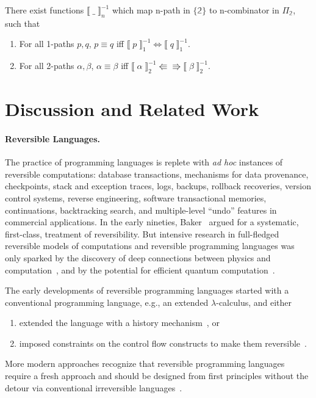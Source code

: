 \documentclass{entcs}
\newcommand{\isotwo}{\Leftrightarrow}
\newcommand{\isothree}{\Lleftarrow \! \! \! \! \Rrightarrow}
\newcommand{\bt}{\mathbb{2}}
\newcommand{\dbracket}[1]{\ensuremath{\llbracket \; #1 \; \rrbracket}}
\newcommand{\PiTwo}{\ensuremath{\Pi_{\mathbb{2}}}}
\begin{document}
\begin{theorem}[Soundness and completeness for $\{\bt\}$]
  There exist functions $\dbracket{ \_ }_n^{-1}$ which map n-path in $\{\bt\}$ to n-combinator in $\PiTwo$,
  such that
  \begin{enumerate}
  \item For all 1-paths $p, q$, $p \equiv q$ iff $\dbracket{ p }_1^{-1} \isotwo \dbracket{ q }_1^{-1}$.
  \item For all 2-paths $\alpha, \beta$, $\alpha \equiv \beta$ iff $\dbracket{ \alpha }_2^{-1} \isothree \dbracket{ \beta }_2^{-1}$.
  \end{enumerate}
\end{theorem}

\section{Discussion and Related Work}
\label{sec:discussion}

\paragraph*{Reversible Languages.}
\noindent The practice of programming languages is replete with \emph{ad hoc}
instances of reversible computations: database transactions, mechanisms for data
provenance, checkpoints, stack and exception traces, logs, backups, rollback
recoveries, version control systems, reverse engineering, software transactional
memories, continuations, backtracking search, and multiple-level ``undo''
features in commercial applications. In the early nineties,
Baker~\cite{Baker:1992:LLL,Baker:1992:NFT} argued for a systematic, first-class,
treatment of reversibility. But intensive research in full-fledged reversible
models of computations and reversible programming languages was only sparked by
the discovery of deep connections between physics and
computation~\cite{Landauer:1961,PhysRevA.32.3266,Toffoli:1980,bennett1985fundamental,Frank:1999:REC:930275},
and by the potential for efficient quantum
computation~\cite{springerlink:10.1007/BF02650179}.

The early developments of reversible programming languages started with a
conventional programming language, e.g., an extended $\lambda$-calculus, and either
\begin{enumerate}
\item extended the language with a history
mechanism~\cite{vanTonder:2004,Kluge:1999:SEMCD,lorenz,danos2004reversible}, or
\item imposed constraints on the control flow constructs to make them
reversible~\cite{Yokoyama:2007:RPL:1244381.1244404}.
\end{enumerate}
More modern approaches recognize that reversible programming languages require
a fresh approach and should be designed from first principles without the
detour via conventional irreversible
languages~\cite{Yokoyama:2008:PRP,Mu:2004:ILRC,abramsky2005structural,DiPierro:2006:RCL:1166042.1166047}.
\end{document}
